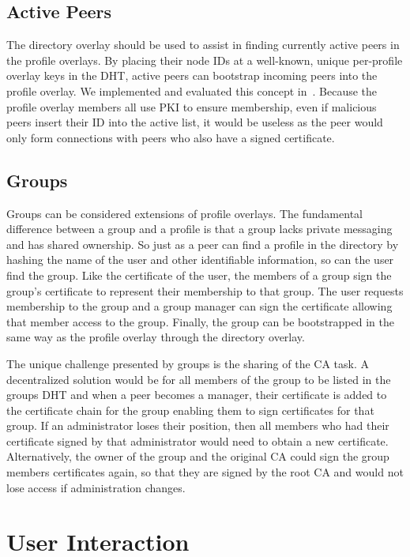 \documentclass[conference]{IEEEtran}
\begin{document}
\subsection{Active Peers}

The directory overlay should be used to assist in finding currently active
peers in the profile overlays.  By placing their node IDs at a well-known,
unique per-profile overlay keys in the DHT, active peers can bootstrap
incoming peers into the profile overlay.  We implemented and evaluated this
concept in~\cite{vpo}.  Because the profile overlay members all use PKI to
ensure membership, even if malicious peers insert their ID into the active
list, it would be useless as the peer would only form connections with peers
who also have a signed certificate.

\subsection{Groups}

Groups can be considered extensions of profile overlays.  The fundamental
difference between a group and a profile is that a group lacks private
messaging and has shared ownership.  So just as a peer can find a profile in
the directory by hashing the name of the user and other identifiable
information, so can the user find the group.  Like the certificate of the
user, the members of a group sign the group's certificate to represent their
membership to that group.  The user requests membership to the group and a
group manager can sign the certificate allowing that member access to the
group.  Finally, the group can be bootstrapped in the same way as the profile
overlay through the directory overlay.

The unique challenge presented by groups is the sharing of the CA task.  A
decentralized solution would be for all members of the group to be listed in
the groups DHT and when a peer becomes a manager, their certificate is added
to the certificate chain for the group enabling them to sign certificates for
that group.  If an administrator loses their position, then all members who
had their certificate signed by that administrator would need to obtain a new
certificate.  Alternatively, the owner of the group and the original CA could
sign the group members certificates again, so that they are signed by the root
CA and would not lose access if administration changes.

\section{User Interaction}
\label{user_interaction}
\end{document}
